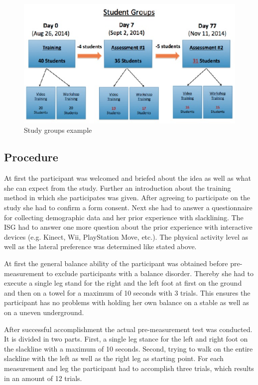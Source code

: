 \begin{figure}[htb]
	\centering
	\begin{minipage}[t]{1\linewidth}
		\centering
		\includegraphics[width=0.8\linewidth]{Pictures/6_studyGroupsExample}
		\caption{Study groups example}
		\label{fig:6_studyGroups}
	\end{minipage}
\end{figure}

\subsection{Procedure}
At first the participant was welcomed and briefed about the idea as well as what she can expect from the study.
Further an introduction about the training method in which she participates was given.
After agreeing to participate on the study she had to confirm a form consent.
Next she had to answer a questionnaire for collecting demographic data and her prior experience with slacklining.
The ISG had to answer one more question about the prior experience with interactive devices (e.g. Kinect, Wii, PlayStation Move, etc.).
The physical activity level as well as the lateral preference was determined like stated above.

At first the general balance ability of the participant was obtained before pre-measurement to exclude participants with a balance disorder.
Thereby she had to execute a single leg stand for the right and the left foot at first on the ground and then on a towel for a maximum of 10 seconds with 3 trials.
This ensures the participant has no problems with holding her own balance on a stable as well as on a uneven underground.

After successful accomplishment the actual pre-measurement test was conducted.
It is divided in two parts.
First, a single leg stance for the left and right foot on the slackline with a maximum of 10 seconds.
Second, trying to walk on the entire slackline with the left as well as the right leg as starting point.
For each measurement and leg the participant had to accomplish three trials, which results in an amount of 12 trials.

